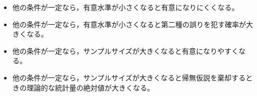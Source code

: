 \begin{itemize}
	\item 他の条件が一定なら，有意水準が小さくなると有意になりにくくなる。
	\item 他の条件が一定なら，有意水準が小さくなると第二種の誤りを犯す確率が大きくなる。
	\item 他の条件が一定なら，サンプルサイズが大きくなると有意になりやすくなる。
	\item 他の条件が一定なら，サンプルサイズが大きくなると帰無仮説を棄却するときの理論的な統計量の絶対値が大きくなる。
\end{itemize}
